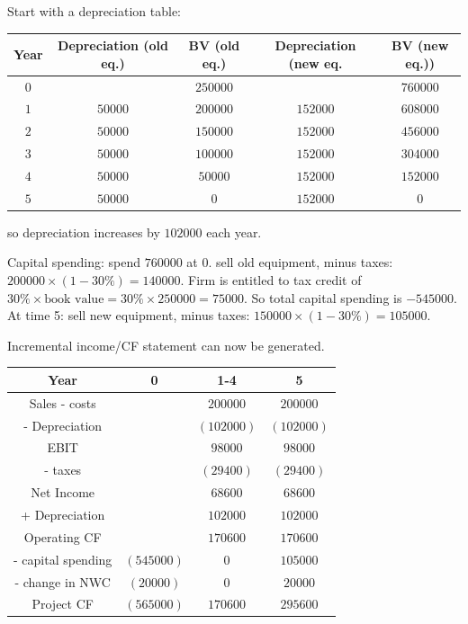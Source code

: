 \documentclass[12pt, letterpaper, parskip = full]{article}
\begin{document}
    Start with a depreciation table:

    \begin{center}
	\begin{tabular}{|c|c|c|c|c|}
		\hline
		Year & Depreciation (old eq.) & BV (old eq.) & Depreciation (new eq. & BV (new eq.)) \\
		\hline
		\(0\) &  & \(250000\) & & \(760000\) \\
        \hline
        \(1\) & \(50000\) & \(200000\) & \(152000\) & \(608000\) \\
		\hline
        \(2\) & \(50000\) & \(150000\) & \(152000\) & \(456000\) \\
        \hline
        \(3\) & \(50000\) & \(100000\) & \(152000\) & \(304000\) \\
        \hline
        \(4\) & \(50000\) & \(50000\) & \(152000\) & \(152000\) \\
        \hline
        \(5\) & \(50000\) & \(0\) & \(152000\) & \(0\) \\
        \hline 
	\end{tabular}
	\end{center}

    so depreciation increases by \(102000\) each year.

    Capital spending: spend \(760000\) at \(0\). sell old equipment, minus taxes: \(200000 \times (1-30\%) = 140000\). Firm is entitled to tax credit of \(30\% \times \text{book value} = 30\% \times 250000 = 75000\). So total capital spending is \(-545000\). At time 5: sell new equipment, minus taxes: \(150000 \times (1-30\%) = 105000\). 

    Incremental income/CF statement can now be generated. 

    \begin{center}
	\begin{tabular}{|c|c|c|c|}
		\hline
		Year & 0 & 1-4 & 5 \\
		\hline
		Sales - costs &  & \(200000\) & \(200000\) \\
        \hline
        - Depreciation & & \((102000)\) & \((102000)\)\\
        \hline
        \hline
        EBIT & & \(98000\) & \(98000\) \\
        \hline
        - taxes & & \((29400)\) & \((29400)\) \\
        \hline
        \hline
        Net Income & & \(68600\) & \(68600\) \\
        \hline
        + Depreciation & & \(102000\) & \(102000\) \\
        \hline
        \hline
        Operating CF & & \(170600\) & \(170600\) \\
        \hline
        - capital spending & \((545000)\) & \(0\) & \(105000\) \\
        \hline
        - change in NWC &\((20000)\) & \(0\) & \(20000\) \\
        \hline
        \hline
        Project CF & \((565000)\) & \(170600\) & \(295600\) \\
        \hline
	\end{tabular}
	\end{center}
\end{document}
